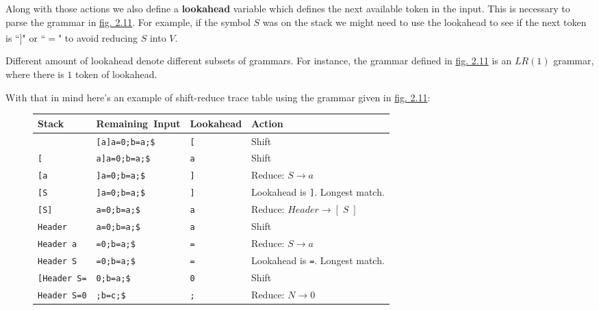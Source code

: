 Along with those actions we also define a \textbf{lookahead} variable which defines the next available token in the input. This is necessary to parse the grammar in \hyperref[fig:2.11]{fig. 2.11}. For example, if the symbol $S$ was on the stack we might need to use the lookahead to see if the next token is ``$]$" or ``$=$" to avoid reducing $S$ into $V$.\textsuperscript{\cite{johnson_zelenski_2007}\cite{knuth_1965}}

Different amount of lookahead denote different subsets of grammars. For instance, the grammar defined in \hyperref[fig:2.11]{fig. 2.11} is an $LR(1)$ grammar, where there is $1$ token of lookahead.

With that in mind here's an example of shift-reduce trace table using the grammar given in \hyperref[fig:2.11]{fig. 2.11}:

\begin{figure}[H]
    \begin{center}
        \begin{tabular}{| m{3.5cm} | m{3cm} | m{2cm} | m{5cm} |}
            \hline
            Stack & \mbox{Remaining Input} & Lookahead & Action\\
            \hline
            & \verb|[a]a=0;b=a;$| & \verb|[| & Shift\\
            \hline
            \verb|[| & \verb|a]a=0;b=a;$| & \verb|a| & Shift\\
            \hline
            \verb|[a| & \verb|]a=0;b=a;$| & \verb|]| & Reduce: $S \rightarrow a$\\
            \hline
            \verb|[S| & \verb|]a=0;b=a;$| & \verb|]| & Lookahead is \verb|]|. Longest match.\\
            \hline
            \verb|[S]| & \verb|a=0;b=a;$| & \verb|a| & Reduce: $Header \rightarrow [\;S\;]$\\
            \hline
            \verb|Header| & \verb|a=0;b=a;$| & \verb|a| & Shift\\
            \hline
            \verb|Header a| & \verb|=0;b=a;$| & \verb|=| & Reduce: $S \rightarrow a$\\
            \hline
            \verb|Header S| & \verb|=0;b=a;$| & \verb|=| & Lookahead is \verb|=|. Longest match.\\
            \hline
            \verb|[Header S=| & \verb|0;b=a;$| & \verb|0| & Shift\\
            \hline
            \verb|Header S=0| & \verb|;b=c;$| & \verb|;| & Reduce: $N \rightarrow 0$\\
            \hline

\end{tabular}
\end{center}
\end{figure}
